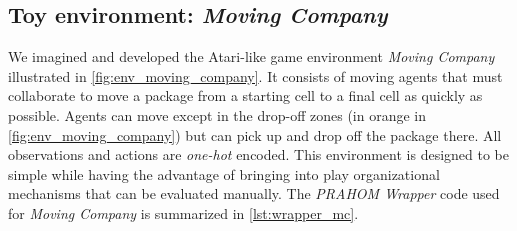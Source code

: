 \documentclass[doubleblind]{ecai}
\newcommand{\probP}{\text{I\kern-0.15em P}}
\begin{document}



\subsection{Toy environment: \emph{Moving Company}}

We imagined and developed the Atari-like game environment \emph{Moving Company} illustrated in \autoref{fig:env_moving_company}.
It consists of moving agents that must collaborate to move a package from a starting cell to a final cell as quickly as possible. Agents can move except in the drop-off zones (in orange in \autoref{fig:env_moving_company}) but can pick up and drop off the package there. All observations and actions are \emph{one-hot} encoded. This environment is designed to be simple while having the advantage of bringing into play organizational mechanisms that can be evaluated manually.
The \emph{PRAHOM Wrapper} code used for \emph{Moving Company} is summarized in \autoref{lst:wrapper_mc}.
\end{document}
